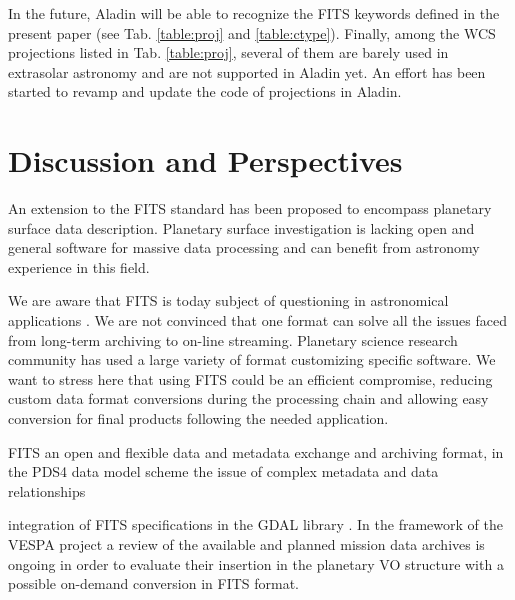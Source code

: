 In the future, Aladin will be able to recognize the FITS keywords defined
in the present paper (see Tab. \ref{table:proj} and \ref{table:ctype}).
\DIFdelbegin {}\DIFdelend Finally, among the WCS projections listed in Tab. \ref{table:proj}, several of
them are barely used in extrasolar astronomy and are not supported in Aladin yet.
An effort has been started to revamp and update the code of projections in
Aladin.
\DIFdelbegin {}\DIFdelend 

\section{Discussion and Perspectives}
\label{sec:disc}
An extension to the FITS standard has been proposed to encompass planetary
surface data description.
Planetary surface investigation is lacking open and general software for massive data
processing and can benefit from astronomy experience in this field.

We are aware that FITS is today subject of questioning in astronomical applications
\citep{THOMAS2015133}.
We are not convinced that one format can solve all the issues faced from long-term
archiving to on-line streaming.
Planetary science research community has used a large variety of format customizing
specific software.
We want to stress here that using FITS could be an efficient compromise, reducing custom
data format conversions during the processing chain and
allowing easy conversion for final products following the needed application.

FITS \DIFdelbegin {}\DIFdelend \DIFaddbegin {}\DIFaddend an open and flexible data and metadata exchange and archiving format, \DIFdelbegin {}\DIFdelend \DIFaddbegin {}\DIFaddend in the PDS4 data model scheme \DIFdelbegin {}\DIFdelend \DIFaddbegin {}\DIFaddend the issue of \DIFdelbegin {}\DIFdelend complex
metadata and data relationships \DIFdelbegin {}\DIFdelend \DIFaddbegin {}\DIFaddend 

\DIFdelbegin {}\DIFdelend \DIFaddbegin {}\DIFaddend integration of FITS specifications in the GDAL library \DIFaddbegin {}\DIFaddend .
In the framework of the VESPA project a review of the available and planned mission data
archives is ongoing in order to evaluate their insertion in the planetary VO structure
with a possible on-demand conversion in FITS format.

